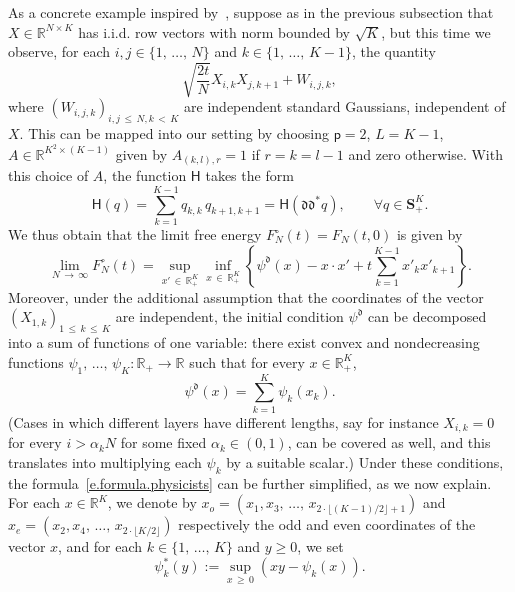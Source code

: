 \documentclass[10pt]{amsart}
\theoremstyle{definition}\newtheorem{defi}[theo]{Definition}\newtheorem{rema}[theo]{Remark}\newtheorem{exam}[theo]{Example}\newtheorem{exem}[theo]{Example}\newtheorem{nota}[theo]{Notation}
\newcommand{\R}{\mathbb{R}}
\renewcommand{\S}{\mathbf{S}}
\renewcommand{\H}{\mathsf{H}}
\newcommand{\sfp}{\mathsf{p}}
\newcommand{\diag}{\mathfrak{d}}
\renewcommand{\le}{\leqslant}
\renewcommand{\ge}{\geqslant}
\newcommand{\Ll}{\left}
\newcommand{\Rr}{\right}
\newcommand{\al}{\alpha}
\let\oldforall\forall
\renewcommand*{\forall}{\mathrel{\oldforall}}
\begin{document}
As a concrete example inspired by~\cite{accm}, suppose as in the previous subsection that $X \in \R^{N\times K}$ has i.i.d. row vectors with norm bounded by $\sqrt{K}$, but this time we observe, for each $i,j \in \{1,\,\ldots,\,N\}$ and $k \in \{1,\,\ldots,\,K-1\}$, the quantity
\begin{equation*}
\sqrt{\frac{2t}{N}} X_{i,k} X_{j,k+1} + W_{i,j,k},
\end{equation*}
where $(W_{i,j,k})_{i,j\,\le\,N, k\,<\,K}$ are independent standard Gaussians, independent of $X$. This can be mapped into our setting by choosing $\sfp=2$, $L = K-1$, $A \in \R^{K^2 \times (K-1)}$ given by $A_{(k,l),r} = 1$ if $r = k = l-1$ and zero otherwise. With this choice of $A$, the function $\H$ takes the form
\begin{equation*}
\H(q) = \sum_{k = 1}^{K-1} q_{k,k} \, q_{k+1,k+1} = \H(\diag\diag^* q), \qquad \forall q \in \S^K_+.
\end{equation*}
We thus obtain that the limit free energy $F_N^\circ(t) = F_N(t,0)$ is given by
\begin{equation}\label{e.formula.physicists}
\lim_{N\,\to\,\infty} F_N^\circ(t) = \sup_{x'\,\in\,\R^K_+}\inf_{x\,\in\,\R^K_+}\Ll\{\psi^\diag\!\left(x\right)- x \cdot x' +t \sum_{k = 1}^{K-1} x'_k x'_{k+1}\Rr\}.
\end{equation}
Moreover, under the additional assumption that the coordinates of the vector $(X_{1,k})_{1\,\le\,k\,\le\,K}$ are independent, the initial condition $\psi^\diag$ can be decomposed into a sum of functions of one variable: there exist convex and nondecreasing functions $\psi_1,\,\ldots,\,\psi_K : \R_+ \to \R$ such that for every $x \in \R_+^K$,
\begin{equation*}
\psi^\diag\!(x) = \sum_{k = 1}^K \psi_k(x_k).
\end{equation*}
(Cases in which different layers have different lengths, say for instance $X_{i,k} = 0$ for every $i > \al_k N$ for some fixed $\al_k \in (0,1)$, can be covered as well, and this translates into multiplying each $\psi_k$ by a suitable scalar.) Under these conditions, the formula~\eqref{e.formula.physicists} can be further simplified, as we now explain. For each $x \in \R^K$, we denote by $x_o = (x_1,x_3,\,\ldots,\,x_{2\cdot\lfloor (K-1)/2 \rfloor + 1})$ and $x_e = (x_2, x_4,\,\ldots,\,x_{2 \cdot \lfloor K/2 \rfloor})$ respectively the odd and even coordinates of the vector $x$, and for each $k \in \{1,\,\ldots,\,K\}$ and $y \ge 0$, we set
\begin{equation*}
\psi_k^*(y) := \sup_{x\,\ge\,0} \Ll(xy - \psi_k(x)\Rr).
\end{equation*}
\end{document}
